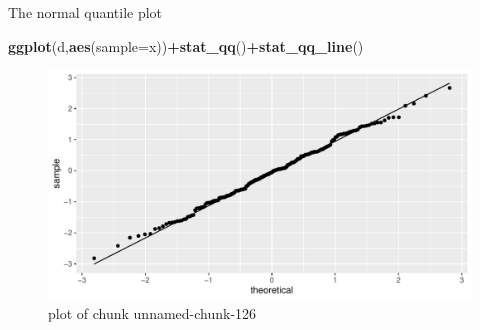 \documentclass[ignorenonframetext,]{beamer}
\newenvironment{Shaded}{\begin{snugshade}}{\end{snugshade}}
\newcommand{\DataTypeTok}[1]{\textcolor[rgb]{0.13,0.29,0.53}{#1}}
\newcommand{\KeywordTok}[1]{\textcolor[rgb]{0.13,0.29,0.53}{\textbf{#1}}}
\newcommand{\NormalTok}[1]{#1}
\newcommand{\OperatorTok}[1]{\textcolor[rgb]{0.81,0.36,0.00}{\textbf{#1}}}
\begin{document}
\begin{frame}[fragile]{The normal quantile plot}
\protect\hypertarget{the-normal-quantile-plot-1}{}

\begin{Shaded}
\begin{Highlighting}[]
\KeywordTok{ggplot}\NormalTok{(d,}\KeywordTok{aes}\NormalTok{(}\DataTypeTok{sample=}\NormalTok{x))}\OperatorTok{+}\KeywordTok{stat_qq}\NormalTok{()}\OperatorTok{+}\KeywordTok{stat_qq_line}\NormalTok{()}
\end{Highlighting}
\end{Shaded}

\begin{figure}
\centering
\includegraphics{figure/unnamed-chunk-126-1.pdf}
\caption{plot of chunk unnamed-chunk-126}
\end{figure}

\end{frame}
\end{document}
